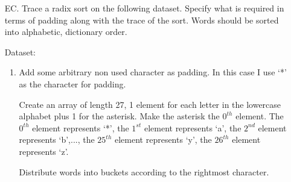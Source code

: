 \documentclass[10pt]{article}
\begin{document}
       		\begin{enumerate}
           		\item[EC.] Trace a radix sort on the following dataset. Specify what is required in terms of padding along with the trace of the sort. Words should be sorted into alphabetic, dictionary order.
           		
           			\vspace{0.5cm}
           			Dataset:
           		
           			
           			\begin{enumerate}
           				\item Add some arbitrary non used character as padding. In this case I use `*' as the character for padding.
           					
           					
           					\vspace{0.5cm}
           					Create an array of length 27, 1 element for each letter in the lowercase alphabet plus 1 for the asterisk. Make the asterisk the $0^{th}$ element. The $0^{th}$ element represents `*', the $1^{st}$ element represents `a', the $2^{nd}$ element represents `b',..., the $25^{th}$ element represents `y', the $26^{th}$ element represents `z'.
           					
           					\vspace{0.5cm}
           					Distribute words into buckets according to the rightmost character.
           					
           					\vspace{0.5cm}
\end{enumerate}
\end{enumerate}
\end{document}
